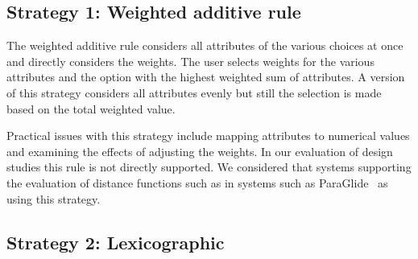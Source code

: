 
\subsection{Strategy 1: Weighted additive rule}\label{weighted-additive-rule}

The weighted additive rule considers all
attributes of the various choices at once and directly considers 
the weights. The user selects weights for the various attributes and 
the option with the highest weighted sum of attributes.
A version of this strategy considers all attributes evenly but still
the selection is made based on the total weighted value.

Practical issues with this strategy include mapping attributes to numerical values
and examining the effects of adjusting the weights. In our evaluation of
design studies this rule is not directly supported. We considered that
systems supporting the evaluation of distance functions such as 
in systems such as ParaGlide~\citep{Bergner:2013} as using this strategy.

\begin{table}[tb]
    \caption{Classification of the 21 papers listed in 
             Sedlmair et al.~\citep{Sedlmair:2014} according to which decision making
             strategies.  %
    }
    \label{tbl:decision-types}
\end{table}

\subsection{Strategy 2: Lexicographic}\label{lexicographic}

